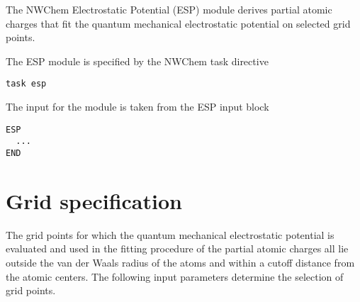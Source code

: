 %
%
\label{sec:esp}

The NWChem Electrostatic Potential (ESP) module derives partial atomic 
charges that fit the quantum mechanical electrostatic potential on selected
grid points.

The ESP module is specified by the NWChem task directive
\begin{verbatim}
task esp
\end{verbatim}

The input for the module is taken from the ESP input block
\begin{verbatim}
ESP
  ...
END
\end{verbatim}

\section{Grid specification}
The grid points for which the quantum mechanical electrostatic potential is 
evaluated and used in the fitting procedure of the partial atomic charges
all lie outside the van der Waals radius of the atoms and within a cutoff
distance from the atomic centers. The following input parameters determine
the selection of grid points.
